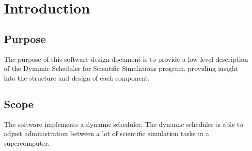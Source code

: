 \section{Introduction}






\subsection{Purpose}
The purpose of this software design document is to provide a low-level description of the Dynamic Scheduler for Scientific Simulations program, providing insight into the structure and design of each component.

\subsection{Scope}
The software implements a dynamic scheduler. The dynamic scheduler is able to adjust administration between a lot of scientific simulation tasks in a supercomputer.

